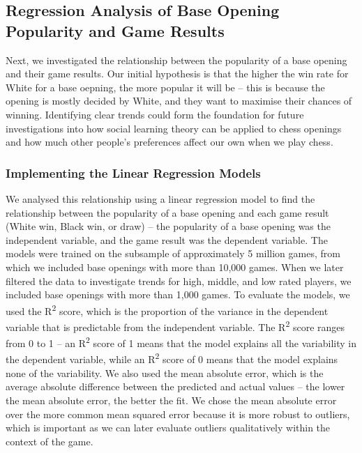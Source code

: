 \documentclass[a4paper, 11pt]{article}
\begin{document}
\subsection{Regression Analysis of Base Opening Popularity and Game Results}
Next, we investigated the relationship between the popularity of a base opening and their game results. Our initial hypothesis is that the higher the win rate for White for a base oepning, the more popular it will be -- this is because the opening is mostly decided by White, and they want to maximise their chances of winning. Identifying clear trends could form the foundation for future investigations into how social learning theory can be applied to chess openings and how much other people's preferences affect our own when we play chess.

\subsubsection{Implementing the Linear Regression Models}
We analysed this relationship using a linear regression model to find the relationship between the popularity of a base opening and each game result (White win, Black win, or draw) -- the popularity of a base opening was the independent variable, and the game result was the dependent variable. The models were trained on the subsample of approximately 5 million games, from which we included base openings with more than 10,000 games. When we later filtered the data to investigate trends for high, middle, and low rated players, we included base openings with more than 1,000 games. To evaluate the models, we used the R\textsuperscript{2} score, which is the proportion of the variance in the dependent variable that is predictable from the independent variable. The R\textsuperscript{2} score ranges from 0 to 1 -- an R\textsuperscript{2} score of 1 means that the model explains all the variability in the dependent variable, while an R\textsuperscript{2} score of 0 means that the model explains none of the variability. We also used the mean absolute error, which is the average absolute difference between the predicted and actual values -- the lower the mean absolute error, the better the fit. We chose the mean absolute error over the more common mean squared error because it is more robust to outliers, which is important as we can later evaluate outliers qualitatively within the context of the game.
\end{document}
